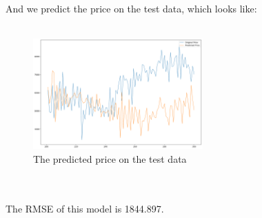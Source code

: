 \documentclass{article}
\begin{document}
\\
\\
And we predict the price on the test data, which looks like:
\\
\\
\begin{figure}[htbp]\centering
	\includegraphics[width=6.5cm]{Fourier_test.png}
	\caption{The predicted price on the test data}
	\label{fig: Fourier Transform}
\end{figure}
\\
\\
The RMSE of this model is 1844.897.
\\
\\
\end{document}
